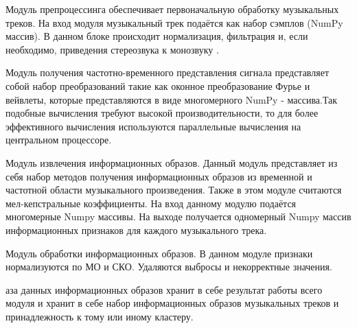 Модуль препроцессинга обеспечивает первоначальную обработку музыкальных треков. На вход модуля музыкальный трек подаётся как набор сэмплов (NumPy массив). В данном блоке происходит нормализация, фильтрация и, если необходимо, приведения стереозвука к монозвуку .

Модуль получения частотно-временного представления сигнала представляет собой набор преобразований такие как оконное преобразование Фурье и  вейвлеты, которые представляются в виде многомерного NumPy - массива.Так подобные вычисления требуют высокой производительности, то для более эффективного вычисления используются параллельные вычисления на центральном процессоре.

Модуль извлечения информационных образов. Данный модуль представляет из себя набор методов получения информационных образов из временной и частотной области музыкального произведения. Также в этом модуле считаются мел-кепстральные коэффициенты. На вход данному модулю подаётся многомерные Numpy массивы. На выходе получается одномерный Numpy массив информационных признаков для каждого музыкального трека.

Модуль обработки информационных образов. В данном модуле признаки нормализуются по МО и СКО. Удаляются выбросы и некорректные значения.


аза данных информационных образов хранит в себе результат работы всего модуля и хранит в себе набор информационных образов музыкальных треков и принадлежность к тому или иному кластеру.


